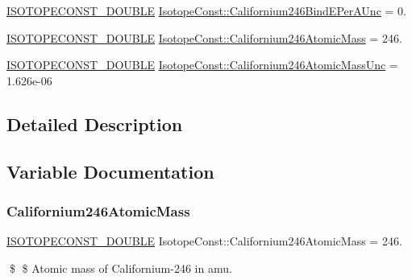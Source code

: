 \begin{DoxyCompactItemize}
\item 
\mbox{\hyperlink{group___isotope_const-_macros_ga8f45a7272ce02c0b4c65c44636ed719a}{I\+S\+O\+T\+O\+P\+E\+C\+O\+N\+S\+T\+\_\+\+D\+O\+U\+B\+LE}} \mbox{\hyperlink{group___isotope_const-_californium-_cf246_ga8a58a10afe6573871bae12b4d538a170}{Isotope\+Const\+::\+Californium246\+Bind\+E\+Per\+A\+Unc}} = 0.
\item 
\mbox{\hyperlink{group___isotope_const-_macros_ga8f45a7272ce02c0b4c65c44636ed719a}{I\+S\+O\+T\+O\+P\+E\+C\+O\+N\+S\+T\+\_\+\+D\+O\+U\+B\+LE}} \mbox{\hyperlink{group___isotope_const-_californium-_cf246_ga555a1675fd817aa8529109e3f533ffa3}{Isotope\+Const\+::\+Californium246\+Atomic\+Mass}} = 246.
\item 
\mbox{\hyperlink{group___isotope_const-_macros_ga8f45a7272ce02c0b4c65c44636ed719a}{I\+S\+O\+T\+O\+P\+E\+C\+O\+N\+S\+T\+\_\+\+D\+O\+U\+B\+LE}} \mbox{\hyperlink{group___isotope_const-_californium-_cf246_ga468d46e8a2400106d2a37df15fce07fd}{Isotope\+Const\+::\+Californium246\+Atomic\+Mass\+Unc}} = 1.\+626e-\/06
\end{DoxyCompactItemize}


\subsection{Detailed Description}


\subsection{Variable Documentation}
\mbox{\label{group___isotope_const-_californium-_cf246_ga555a1675fd817aa8529109e3f533ffa3}} 
\subsubsection{\texorpdfstring{Californium246\+Atomic\+Mass}{Californium246AtomicMass}}
{\footnotesize\ttfamily \mbox{\hyperlink{group___isotope_const-_macros_ga8f45a7272ce02c0b4c65c44636ed719a}{I\+S\+O\+T\+O\+P\+E\+C\+O\+N\+S\+T\+\_\+\+D\+O\+U\+B\+LE}} Isotope\+Const\+::\+Californium246\+Atomic\+Mass = 246.}

\$ \$ Atomic mass of Californium-\/246 in amu. \mbox{\label{group___isotope_const-_californium-_cf246_ga468d46e8a2400106d2a37df15fce07fd}} 
